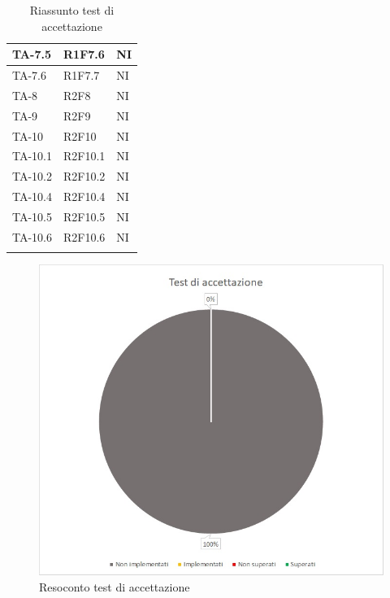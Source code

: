 \begin{longtable}{|C{2.5cm}|C{2.5cm}|C{2.5cm}|}
	\hline
	{TA-7.5} & {R1F7.6}
	& {NI}\\
	\hline
	{TA-7.6} & {R1F7.7}
	& {NI}\\
	\hline
	{TA-8} & {R2F8}
	& {NI}\\
	\hline
	{TA-9} & {R2F9}
	& {NI}\\
	\hline
	{TA-10} & {R2F10}
	& {NI}\\
	\hline
	{TA-10.1} & {R2F10.1}
	& {NI}\\
	\hline
	{TA-10.2} & {R2F10.2}
	& {NI}\\
	\hline
	{TA-10.4} & {R2F10.4}
	& {NI}\\
	\hline
	{TA-10.5} & {R2F10.5}
	& {NI}\\
	\hline
	{TA-10.6} & {R2F10.6}
	& {NI}\\
	\hline
	\caption{Riassunto test di accettazione}
	\label{tabella:riassunto ta}
\end{longtable}
\normalsize
\renewcommand{\arraystretch}{1}
\begin{figure} [H]
	\centering
	\includegraphics[scale=1]{Img/TA}
	\caption{Resoconto test di accettazione}\label{}
\end{figure}
\newpage

